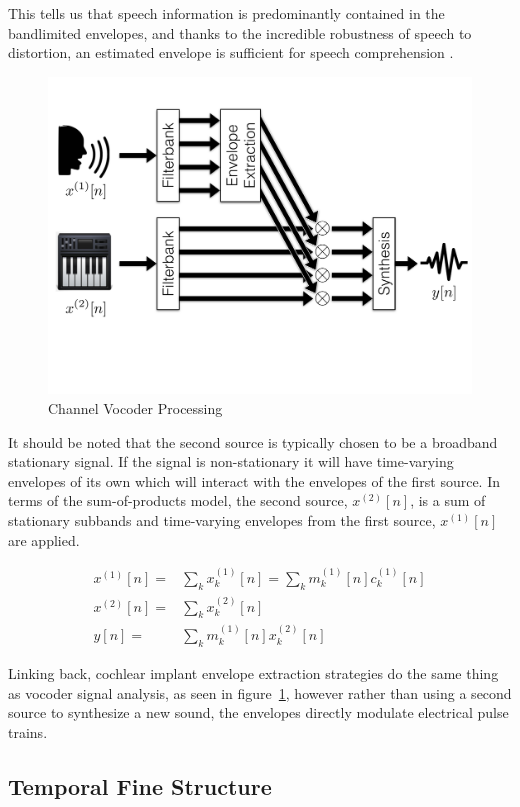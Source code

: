 \documentclass [11pt, proquest,oneside] {ganter_thesis}[2015/03/03]
\begin{document}
This tells us that speech information is predominantly contained in the bandlimited envelopes, and thanks to the incredible robustness of speech to distortion, an estimated envelope is sufficient for speech comprehension \cite{shannon1995speech}.

\begin{figure}[!ht]
  \centering
    \includegraphics[width=.75\textwidth]{vocoder}   
    \caption{Channel Vocoder Processing}\label{fig:vocoder}
\end{figure}

It should be noted that the second source is typically chosen to be a broadband stationary signal.  If the signal is non-stationary it will have time-varying envelopes of its own which will interact with the envelopes of the first source. In terms of the sum-of-products model, the second source, $x^{(2)}[n]$, is a sum of stationary subbands and time-varying envelopes from the first source, $x^{(1)}[n]$ are applied.

\begin{align}
x^{(1)}[n] =& \sum\limits_k x_k^{(1)}[n] = \sum\limits_k m^{(1)}_k[n] c^{(1)}_k[n] \\
x^{(2)}[n] =& \sum\limits_k x_k^{(2)}[n] \\
y[n] =& \sum\limits_k m_k^{(1)}[n] x_k^{(2)}[n]
\end{align}

Linking back, cochlear implant envelope extraction strategies do the same thing as vocoder signal analysis, as seen in figure~\ref{fig:vocoder}, however rather than using a second source to synthesize a new sound, the envelopes directly modulate electrical pulse trains.

\subsection{Temporal Fine Structure}
\end{document}
